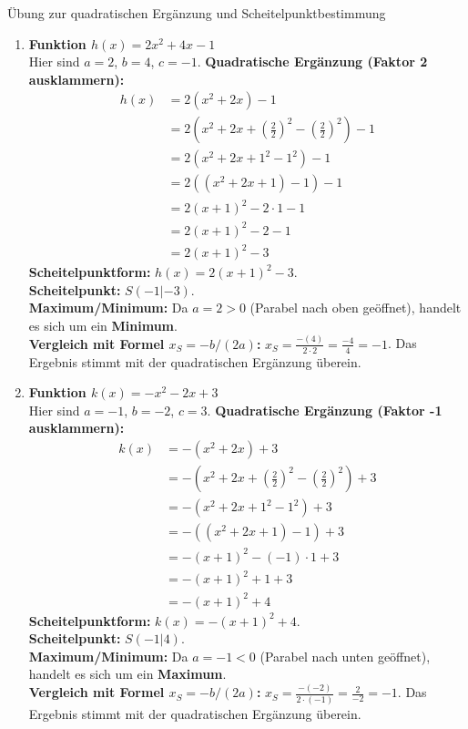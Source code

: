 \begin{loesungsumgebung}{Übung zur quadratischen Ergänzung und Scheitelpunktbestimmung}
\begin{enumerate}[label=(\alph*)]
    \item \textbf{Funktion $h(x) = 2x^2 + 4x - 1$} \\
    Hier sind $a=2$, $b=4$, $c=-1$.
    \textbf{Quadratische Ergänzung (Faktor 2 ausklammern):}
    \begin{align*}
    h(x) &= 2(x^2 + 2x) - 1 \\
         &= 2\left(x^2 + 2x + \left(\frac{2}{2}\right)^2 - \left(\frac{2}{2}\right)^2\right) - 1 \\
         &= 2(x^2 + 2x + 1^2 - 1^2) - 1 \\
         &= 2((x^2 + 2x + 1) - 1) - 1 \\
         &= 2(x + 1)^2 - 2 \cdot 1 - 1 \\
         &= 2(x + 1)^2 - 2 - 1 \\
         &= 2(x + 1)^2 - 3
    \end{align*}
    \textbf{Scheitelpunktform:} $h(x) = 2(x + 1)^2 - 3$. \\
    \textbf{Scheitelpunkt:} $S(-1|-3)$. \\
    \textbf{Maximum/Minimum:} Da $a=2 > 0$ (Parabel nach oben geöffnet), handelt es sich um ein \textbf{Minimum}. \\
    \textbf{Vergleich mit Formel $x_S = -b/(2a)$:}
    $x_S = \frac{-(4)}{2 \cdot 2} = \frac{-4}{4} = -1$. Das Ergebnis stimmt mit der quadratischen Ergänzung überein.

    \item \textbf{Funktion $k(x) = -x^2 - 2x + 3$} \\
    Hier sind $a=-1$, $b=-2$, $c=3$.
    \textbf{Quadratische Ergänzung (Faktor -1 ausklammern):}
    \begin{align*}
    k(x) &= -(x^2 + 2x) + 3 \\ %
         &= -\left(x^2 + 2x + \left(\frac{2}{2}\right)^2 - \left(\frac{2}{2}\right)^2\right) + 3 \\
         &= -(x^2 + 2x + 1^2 - 1^2) + 3 \\
         &= -((x^2 + 2x + 1) - 1) + 3 \\
         &= -(x + 1)^2 - (-1) \cdot 1 + 3 \\
         &= -(x + 1)^2 + 1 + 3 \\
         &= -(x + 1)^2 + 4
    \end{align*}
    \textbf{Scheitelpunktform:} $k(x) = -(x + 1)^2 + 4$. \\
    \textbf{Scheitelpunkt:} $S(-1|4)$. \\
    \textbf{Maximum/Minimum:} Da $a=-1 < 0$ (Parabel nach unten geöffnet), handelt es sich um ein \textbf{Maximum}. \\
    \textbf{Vergleich mit Formel $x_S = -b/(2a)$:}
    $x_S = \frac{-(-2)}{2 \cdot (-1)} = \frac{2}{-2} = -1$. Das Ergebnis stimmt mit der quadratischen Ergänzung überein.
\end{enumerate}

\end{loesungsumgebung}


